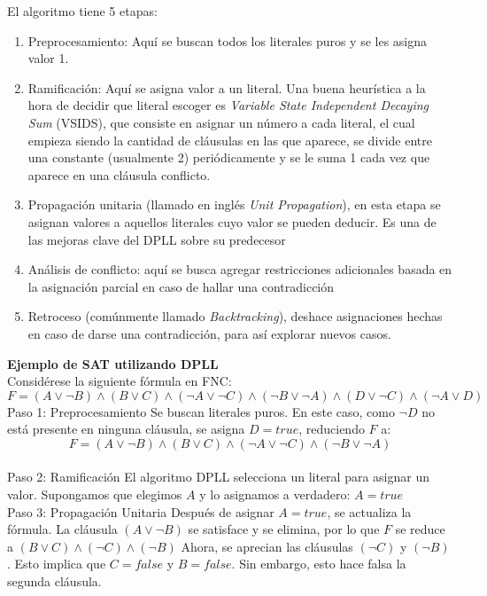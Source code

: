 \documentclass[12pt]{report}
\begin{document}
El algoritmo tiene 5 etapas:
\begin{enumerate}
    \item Preprocesamiento: Aquí se buscan todos los literales puros y se les asigna valor 1.
    \item Ramificación: Aquí se asigna valor a un literal. Una buena heurística a la hora de decidir que literal escoger es \textit{Variable State Independent Decaying Sum} (VSIDS), que consiste en asignar un número a cada literal, el cual empieza siendo la cantidad de cláusulas en las que aparece, se divide entre una constante (usualmente 2) periódicamente y se le suma 1 cada vez que aparece en una cláusula conflicto.
    \item Propagación unitaria (llamado en inglés \textit{Unit Propagation}), en esta etapa se asignan valores a aquellos literales cuyo valor se pueden deducir. Es una de las mejoras clave del DPLL sobre su predecesor
    \item Análisis de conflicto: aquí se busca agregar restricciones adicionales basada en la asignación parcial en caso de hallar una contradicción
    \item Retroceso (comúnmente llamado \textit{Backtracking}), deshace asignaciones hechas en caso de darse una contradicción, para así explorar nuevos casos.\\
\end{enumerate}

\textbf{Ejemplo de SAT utilizando DPLL}\\

Considérese la siguiente fórmula en FNC:
$F=(A\lor \neg B)\land(B\lor C)\land(\neg A\lor \neg C)\land(\neg B\lor \neg A)\land(D\lor \neg C)\land(\neg A\lor D)$\\

Paso 1: Preprocesamiento
Se buscan literales puros. En este caso, como $\neg D$ no está presente en ninguna cláusula, se asigna $D=true$, reduciendo $F$ a:
$$F=(A\lor \neg B)\land(B\lor C)\land(\neg A\lor \neg C)\land(\neg B\lor \neg A)$$\\

Paso 2: Ramificación
El algoritmo DPLL selecciona un literal para asignar un valor. Supongamos que elegimos $A$ y lo asignamos a verdadero:
$A=true$\\

Paso 3: Propagación Unitaria
Después de asignar $A=true$, se actualiza la fórmula. La cláusula $(A\lor \neg B)$ se satisface y se elimina, por lo que $F$ se reduce a $(B\lor C)\land(\neg C)\land(\neg B)$
Ahora, se aprecian las cláusulas $(\neg C)$ y $(\neg B)$. Esto implica que $C=false$ y $B=false$. Sin embargo, esto hace falsa la segunda cláusula.\\
\end{document}
